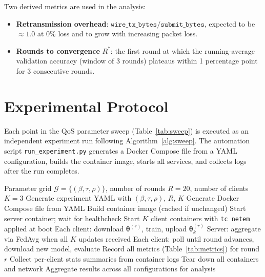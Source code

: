 \documentclass[12pt,a4paper]{report}
\begin{document}
Two derived metrics are used in the analysis:
\begin{itemize}
  \item \textbf{Retransmission overhead}: $\texttt{wire\_tx\_bytes} /
        \texttt{submit\_bytes}$, expected to be $\approx 1.0$ at 0\% loss and to
        grow with increasing packet loss.
  \item \textbf{Rounds to convergence} $R^*$: the first round at which the
        running-average validation accuracy (window of 3 rounds) plateaus within
        1 percentage point for 3 consecutive rounds.
\end{itemize}

\section{Experimental Protocol}

Each point in the QoS parameter sweep (Table~\ref{tab:sweep}) is executed as an
independent experiment run following Algorithm~\ref{alg:sweep}.  The automation
script \texttt{run\_experiment.py} generates a Docker Compose file from a YAML
configuration, builds the container image, starts all services, and collects
logs after the run completes.

\begin{algorithm}[H]
\caption{QoS Sweep Protocol}
\label{alg:sweep}
\begin{algorithmic}[1]
\Require Parameter grid $\mathcal{G} = \{(\beta, \tau, \rho)\}$, number of
         rounds $R = 20$, number of clients $K = 3$
  \State Generate experiment YAML with $(\beta, \tau, \rho)$, $R$, $K$
  \State Generate Docker Compose file from YAML
  \State Build container image (cached if unchanged)
  \State Start server container; wait for healthcheck
  \State Start $K$ client containers with \texttt{tc netem} applied at boot
    \State Each client: download $\boldsymbol{\theta}^{(r)}$, train, upload
           $\boldsymbol{\theta}_k^{(r)}$
    \State Server: aggregate via FedAvg when all $K$ updates received
    \State Each client: poll until round advances, download new model, evaluate
    \State Record all metrics (Table~\ref{tab:metrics}) for round $r$
  \EndFor
  \State Collect per-client stats summaries from container logs
  \State Tear down all containers and network
\EndFor
\State Aggregate results across all configurations for analysis
\end{algorithmic}
\end{algorithm}
\end{document}
